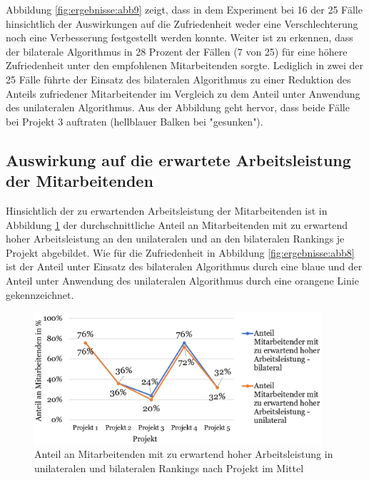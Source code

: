 Abbildung \ref{fig:ergebnisse:abb9} zeigt, dass in dem Experiment bei 16 der 25 Fälle hinsichtlich der Auswirkungen auf die Zufriedenheit weder eine Verschlechterung noch eine Verbesserung festgestellt werden konnte.
Weiter ist zu erkennen, dass der bilaterale Algorithmus in 28 Prozent der Fällen (7 von 25) für eine höhere Zufriedenheit unter den empfohlenen Mitarbeitenden sorgte.
Lediglich in zwei der 25 Fälle führte der Einsatz des bilateralen Algorithmus zu einer Reduktion des Anteils zufriedener Mitarbeitender im Vergleich zu dem Anteil unter Anwendung des unilateralen Algorithmus.
Aus der Abbildung geht hervor, dass beide Fälle bei Projekt 3 auftraten (hellblauer Balken bei "gesunken").


\subsection{Auswirkung auf die erwartete Arbeitsleistung der Mitarbeitenden}
Hinsichtlich der zu erwartenden Arbeitsleistung der Mitarbeitenden ist in Abbildung \ref{fig:ergebnisse:abb10} der durchschnittliche Anteil an Mitarbeitenden mit zu erwartend hoher Arbeitsleistung an den unilateralen und an den bilateralen Rankings je Projekt abgebildet.
Wie für die Zufriedenheit in Abbildung \ref{fig:ergebnisse:abb8} ist der Anteil unter Einsatz des bilateralen Algorithmus durch eine blaue und der Anteil unter Anwendung des unilateralen Algorithmus durch eine orangene Linie gekennzeichnet.

\begin{figure}[H]
    \centering
	\includegraphics[width=0.95\textwidth]{gfx/verhaeltnis-a-durchschnitt-projekte.png}
	\caption[Anteil an Mitarbeitenden mit zu erwartend hoher Arbeitsleistung in unilateralen und bilateralen Rankings nach Projekt im Mittel]{Anteil an Mitarbeitenden mit zu erwartend hoher Arbeitsleistung in unilateralen und bilateralen Rankings nach Projekt im Mittel}
	\label{fig:ergebnisse:abb10}
\end{figure}

